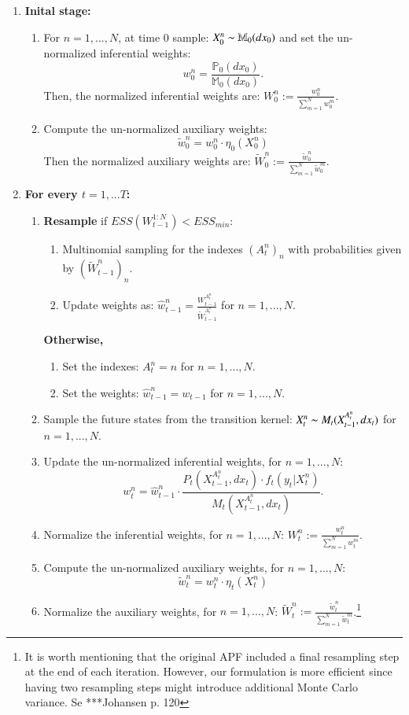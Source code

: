 \documentclass[
]{book}
\theoremstyle{break}
\theoremstyle{nonumberplain}
\begin{document}
\begin{enumerate}
    \item \textbf{Inital stage: }
    \begin{enumerate}
        \item For $n=1,...,N$, at time 0 sample: $X_0^n\thicksim\mathbb M_0(dx_0)$ and set the un-normalized inferential weights: 
    $$w_0^n=\frac{\mathbb P_0(dx_0)}{\mathbb M_0(dx_0)}.$$
    Then, the normalized inferential weights are: $W_0^n:=\frac{w_0^n}{\sum_{m=1}^Nw_0^m}$.
    \item Compute the un-normalized auxiliary weights:
        $$\tilde w_0^n=w_0^n \cdot \eta_0(X_0^n)$$
        Then the normalized auxiliary weights are:
        $\tilde W_0^n:=\frac{\tilde w_0^n}{\sum_{m=1}^N\tilde w_0^m}$.
    \end{enumerate}
    \item \textbf{For every $t=1,...T$:}
    \begin{enumerate}
        \item \textbf{Resample} if $ESS( W_{t-1}^{1:N})<ESS_{min}$:
\begin{enumerate}
    \item Multinomial sampling for the indexes $(A_t^n)_n$ with probabilities given by $(\tilde W_{t-1}^n)_n$.
    \item Update weights as: $\hat w_{t-1}^n = \frac{W_{t-1}^{A_t^n}}{\tilde W_{t-1}^{A_t^n}} $ for $n=1,...,N$.
\end{enumerate}
\textbf{Otherwise, } 
\begin{enumerate}
    \item Set the indexes: $A_t^{n}=n$ for  $n=1,...,N$.
    \item Set the weights: $\hat w_{t-1}^n = w_{t-1}$ for $n=1,...,N$.
\end{enumerate}
\item Sample the future states from the transition kernel: $X_t^n\thicksim M_t(X_{t-1}^{A_t^n},dx_t)$ for $n=1,...,N$.
\item Update the un-normalized inferential weights, for $n=1,...,N$:
\begin{equation*}
    w_t^n=\hat w_{t-1}^n\cdot \frac{P_t(X_{t-1}^{A_t^n},dx_t)\cdot f_t(y_t|X_t^n)}{ M_t(X_{t-1}^{A_t^n},dx_t)}.
\end{equation*}
\item Normalize the inferential weights, for $n=1,...,N$:  $W_t^n:=\frac{w_t^n}{\sum_{m=1}^Nw_t^m}$.
\item Compute the un-normalized auxiliary weights, for $n=1,...,N$:
\begin{equation*}
 \tilde w_t^n=w_t^n \cdot \eta_t(X_t^n)
\end{equation*}
\item Normalize the auxiliary weights, for $n=1,...,N$:  $\tilde W_t^n:=\frac{\tilde w_t^n}{\sum_{m=1}^N\tilde w_t^m}$.\footnote{It is worth mentioning that the original APF included a final resampling step at the end of each iteration. However, our formulation is more efficient since having two resampling steps might introduce additional Monte Carlo variance. Se ***Johansen p. 120}
    \end{enumerate}
\end{enumerate}
\end{document}
